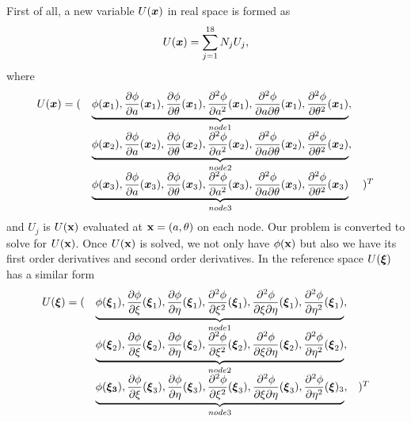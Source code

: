 \documentclass{report}
\newcommand{\bm}[1]{\mbox{\boldmath $#1$}}
\newcommand{\pp}[2]{\frac{\partial{#1}}{\partial{#2}}}
\newcommand{\psp}[2]{\frac{\partial^2{#1}}{\partial{#2}^2}}
\newcommand{\ppp}[3]{\frac{\partial^2{#1}}{\partial{#2}\partial{#3}}}
\def\x{\mbox{\bf x}}
\begin{document}
First of all, a new variable $U(\bm{x})$ in real space is formed as
\begin{equation}
U(\bm{x})=\sum_{j=1}^{18} N_j U_j,
\end{equation}
where
\begin{equation}
\begin{array}{lll}
U(\bm{x})= ( & \underbrace{ \phi(\bm{x}_1),
                            \pp{\phi}{a}(\bm{x}_1),
                            \pp{\phi}{\theta}(\bm{x}_1),
                            \psp{\phi}{a}(\bm{x}_1),
                            \ppp{\phi}{a}{\theta}(\bm{x}_1),
                            \psp{\phi}{\theta}(\bm{x}_1)
                 }_{node 1},
& \\
             & \underbrace{ \phi(\bm{x}_2),
                            \pp{\phi}{a}(\bm{x}_2),
                            \pp{\phi}{\theta}(\bm{x}_2),
                            \psp{\phi}{a}(\bm{x}_2),
                            \ppp{\phi}{a}{\theta}(\bm{x}_2),
                            \psp{\phi}{\theta}(\bm{x}_2)
                 }_{node 2},
& \\
             & \underbrace{ \phi(\bm{x}_3),
                            \pp{\phi}{a}(\bm{x}_3),
                            \pp{\phi}{\theta}(\bm{x}_3),
                            \psp{\phi}{a}(\bm{x}_3),
                            \ppp{\phi}{a}{\theta}(\bm{x}_3),
                            \psp{\phi}{\theta}(\bm{x}_3)
                 }_{node 3}
&)^T
\end{array}
\end{equation}
and
$U_j$ is $U(\x)$ evaluated at $\x = (a,\theta)$ on each node.
Our problem is converted to solve for $U(\x)$. Once $U(\x)$ is solved,
we not only have $\phi(\x)$ but also we have its first order derivatives
and second order derivatives. In the reference space $U({\bm \xi})$
has a similar form
\begin{equation}
\begin{array}{lll}
U(\bm{\xi})=( & \underbrace{ \phi(\bm{\xi}_1),
                             \pp{\phi}{\xi}(\bm{\xi}_1),
                             \pp{\phi}{\eta}(\bm{\xi}_1),
                             \psp{\phi}{\xi}(\bm{\xi}_1),
                             \ppp{\phi}{\xi}{\eta}(\bm{\xi}_1),
                             \psp{\phi}{\eta}(\bm{\xi}_1)
                 }_{node 1},
& \\
            &    \underbrace{ \phi(\bm{\xi}_2),
                              \pp{\phi}{\xi}(\bm{\xi}_2),
                              \pp{\phi}{\eta}(\bm{\xi}_2),
                              \psp{\phi}{\xi}(\bm{\xi}_2),
                              \ppp{\phi}{\xi}{\eta}(\bm{\xi}_2),
                              \psp{\phi}{\eta}(\bm{\xi}_2)
                 }_{node 2},
& \\
            &    \underbrace{ \phi(\bm{\xi_3}),
                              \pp{\phi}{\xi}(\bm{\xi}_3),
                              \pp{\phi}{\eta}(\bm{\xi}_3),
                              \psp{\phi}{\xi}(\bm{\xi}_3),
                              \ppp{\phi}{\xi}{\eta}(\bm{\xi}_3),
                              \psp{\phi}{\eta}(\bm{\xi})_3
                 }_{node 3},
& )^T
\end{array}
\end{equation}
\end{document}

